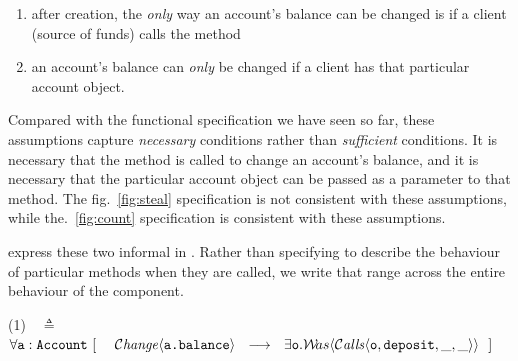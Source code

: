 \begin{enumerate}
\item after creation, the \emph{only} way an account's
  balance can be changed is if a client (source of funds) calls the  method 
\item an account's balance can \emph{only} be changed if a client has
  that particular account object.
\end{enumerate}

Compared with the functional specification we have seen so far, these
assumptions capture \emph{necessary} conditions rather than
\emph{sufficient} conditions. It is necessary that the 
method is called to change an account's balance, and it is necessary
that the particular account object can be passed as a parameter to
that method. The fig.~\ref{fig:steal} specification is not consistent
with these assumptions, while the.~\ref{fig:count} specification is
consistent with these assumptions.


 express these two informal  %
in \Chainmail.  Rather than specifying  to
describe the behaviour of particular methods when they are called, we
write  that range across the entire behaviour of the
component.


(1)\ \  $\triangleq$\ \ $\forall \prg{a}:\prg{Account}\ [\ \ \ \  \Changes{\prg{a.balance}}  \ \    
    \longrightarrow \ \  %
 \exists \prg{o}. \Past{\Calls{\prg{o},\prg{deposit},\_,\_}}   \ \ ]$

